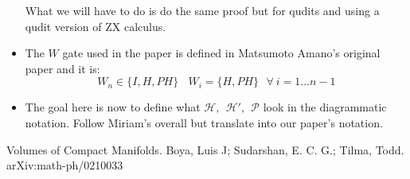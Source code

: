 \documentclass{article}
\begin{document}
\begin{itemize}
\begin{enumerate}
\end{enumerate}
What we will have to do is do the same proof but for qudits and using a qudit version of ZX calculus.
\item The $W$ gate used in the paper is defined in Matsumoto Amano's original paper and it is:
\[
W_{n}\in \{I, H, PH\}~~~~W_{i}=\{H,PH\}~~~\forall~i=1...n-1
\]
\item The goal here is now to define what $\mathcal{H},~~\mathcal{H'},~~ \mathcal{P}$ look in the diagrammatic notation. Follow Miriam's overall but translate into our paper's notation.
\end{itemize}
\begin{thebibliography}{}
 Volumes of Compact Manifolds. Boya, Luis J; Sudarshan, E. C. G.; Tilma, Todd. arXiv:math-ph/0210033 



\end{thebibliography}
\end{document}
